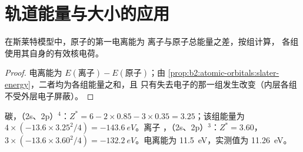 \section{轨道能量与大小的应用}

\begin{proposition}[由斯莱特能量求电离能]\label{prop:b2:atomic-orbitals:ionisation}
在斯莱特模型中，原子的第一电离能为
离子与原子总能量之差，按组计算，
各组使用其自身的有效核电荷。
\end{proposition}

\begin{proof}
电离能为 $E(\text{离子}) - E(\text{原子})$；由
\cref{prop:b2:atomic-orbitals:slater-energy}，二者均为各组能量之和，且
只有失去电子的那一组发生改变（内层各组
不受外层电子屏蔽）。
\end{proof}

\begin{example}[碳]\label{ex:b2:atomic-orbitals:carbon}
碳，（2s、2p）$^4$：$Z^* = 6 - 2 \times 0.85 - 3 \times 0.35 = 3.25$；该组能量为
$4 \times (-13.6 \times 3.25^2/4) = \qty{-143.6}{eV}$。离子 ，（2s、2p）$^3$：$Z^* =
3.60$，$3 \times (-13.6 \times 3.60^2/4) = \qty{-132.2}{eV}$。电离能为
\qty{11.5}{eV}，实测值为 \qty{11.26}{eV}。
\end{example}

